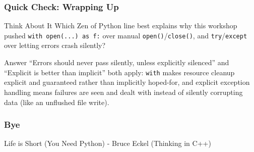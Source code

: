 \begin{frame}[fragile]\frametitle{Quick Check: Wrapping Up}
\begin{block}{Think About It}
Which Zen of Python line best explains why this workshop pushed \lstinline|with open(...) as f:|
over manual \lstinline|open()|/\lstinline|close()|, and \lstinline|try|/\lstinline|except| over
letting errors crash silently?
\end{block}
\pause
\begin{block}{Answer}
``Errors should never pass silently, unless explicitly silenced'' and ``Explicit is better than
implicit'' both apply: \texttt{with} makes resource cleanup explicit and guaranteed rather than
implicitly hoped-for, and explicit exception handling means failures are seen and dealt with
instead of silently corrupting data (like an unflushed file write).
\end{block}
\end{frame}

\begin{frame}\frametitle{Bye}
{\large Life is Short}
(You Need Python)
- Bruce Eckel (Thinking in C++)
\end{frame}



